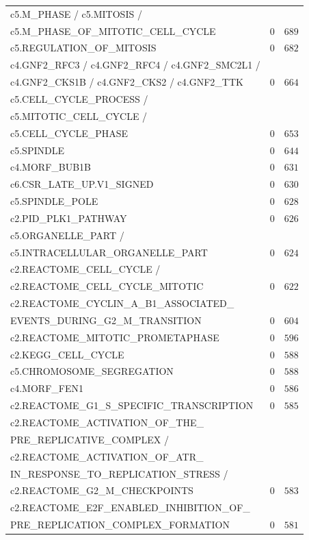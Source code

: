 \begin{longtable}[!htbp]{ l r@{.}l }
c5.M\_PHASE / c5.MITOSIS / \\
\qquad c5.M\_PHASE\_OF\_MITOTIC\_CELL\_CYCLE & $0$ & $689$ \\
c5.REGULATION\_OF\_MITOSIS & $0$ & $682$ \\
c4.GNF2\_RFC3 / c4.GNF2\_RFC4 / c4.GNF2\_SMC2L1 / \\
\qquad c4.GNF2\_CKS1B / c4.GNF2\_CKS2 / c4.GNF2\_TTK & $0$ & $664$ \\
c5.CELL\_CYCLE\_PROCESS / \\
\qquad c5.MITOTIC\_CELL\_CYCLE / \\
\qquad c5.CELL\_CYCLE\_PHASE & $0$ & $653$ \\
c5.SPINDLE & $0$ & $644$ \\
c4.MORF\_BUB1B & $0$ & $631$ \\
c6.CSR\_LATE\_UP.V1\_SIGNED & $0$ & $630$ \\
c5.SPINDLE\_POLE & $0$ & $628$ \\
c2.PID\_PLK1\_PATHWAY & $0$ & $626$ \\
c5.ORGANELLE\_PART / \\
\qquad c5.INTRACELLULAR\_ORGANELLE\_PART & $0$ & $624$ \\
c2.REACTOME\_CELL\_CYCLE / \\
\qquad c2.REACTOME\_CELL\_CYCLE\_MITOTIC & $0$ & $622$ \\
c2.REACTOME\_CYCLIN\_A\_B1\_ASSOCIATED\_ \\
\qquad EVENTS\_DURING\_G2\_M\_TRANSITION & $0$ & $604$ \\
c2.REACTOME\_MITOTIC\_PROMETAPHASE & $0$ & $596$ \\
c2.KEGG\_CELL\_CYCLE & $0$ & $588$ \\
c5.CHROMOSOME\_SEGREGATION & $0$ & $588$ \\
c4.MORF\_FEN1 & $0$ & $586$ \\
c2.REACTOME\_G1\_S\_SPECIFIC\_TRANSCRIPTION & $0$ & $585$ \\
c2.REACTOME\_ACTIVATION\_OF\_THE\_ \\
\qquad PRE\_REPLICATIVE\_COMPLEX / \\
\qquad c2.REACTOME\_ACTIVATION\_OF\_ATR\_ \\ 
\qquad IN\_RESPONSE\_TO\_REPLICATION\_STRESS / \\ 
\qquad c2.REACTOME\_G2\_M\_CHECKPOINTS & $0$ & $583$ \\
c2.REACTOME\_E2F\_ENABLED\_INHIBITION\_OF\_ \\
\qquad PRE\_REPLICATION\_COMPLEX\_FORMATION & $0$ & $581$ \\

\end{longtable}
